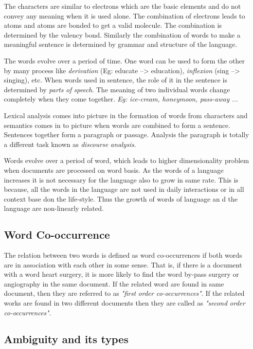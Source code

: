 \documentclass{bmcart}
\begin{document}
The characters are similar to electrons which are the basic elements and do not convey any meaning when it is used alone. The combination of electrons leads to atoms and atoms are bonded to get a valid molecule. The combination is determined by the valency bond. Similarly the combination of words to make a meaningful sentence is determined by grammar and structure of the language. 

The words evolve over a period of time. One word can be used to form the other by many process like \textit{derivation} (Eg: educate --> education), \textit{inflexion} (sing --> singing), etc. When words used in sentence, the role of it in the sentence is determined by \textit{parts of speech}. The meaning of two individual words change completely when they come together. \textit{Eg: ice-cream, honeymoon, pass-away ...}

Lexical analysis comes into picture in the formation of words from characters and semantics comes in to picture when words are combined to form a sentence. Sentences together form a paragraph or passage. Analysis the paragraph is totally a different task known as \textit{discourse analysis}.

	Words evolve over a period of word, which leads to higher dimensionality problem when documents are processed on word basis. As the words of a language increases it is not necessary for the language also to grow in same rate. This is because, all the words in  the language are not used in daily interactions or in all context base don the life-style. Thus the growth of words of  language an d the language are non-linearly related. 
		
	
\subsection{Word Co-occurrence}
\label{ssec:co-occurrence}

The relation between two words is defined as word co-occurrences if both words are in association with each other in some sense. That is, if there is a document with a word heart surgery, it is more likely to find the word by-pass surgery or angiography in the same document. If the related word are found in same document, then they are referred to
as \textit{"first order co-occurrences"}. If the related works are found in two different documents then they are called as \textit{"second order co-occurrences"}.


\subsection{Ambiguity and its types}
\label{ssec:ambiguity}
\end{document}
